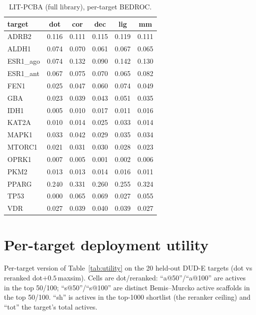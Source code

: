 \documentclass[10pt,letterpaper,twocolumn]{article}
\begin{document}
\begin{table}[h]
\centering
\scriptsize
\setlength{\tabcolsep}{3pt}
\caption{LIT-PCBA (full library), per-target BEDROC.}
\begin{tabular}{@{}lccccc@{}}
\toprule
target & dot & cor & dec & lig & mm \\
\midrule
ADRB2 & 0.116 & 0.111 & 0.115 & 0.119 & 0.111 \\
ALDH1 & 0.074 & 0.070 & 0.061 & 0.067 & 0.065 \\
ESR1\_ago & 0.074 & 0.132 & 0.090 & 0.142 & 0.130 \\
ESR1\_ant & 0.067 & 0.075 & 0.070 & 0.065 & 0.082 \\
FEN1 & 0.025 & 0.047 & 0.060 & 0.074 & 0.049 \\
GBA & 0.023 & 0.039 & 0.043 & 0.051 & 0.035 \\
IDH1 & 0.005 & 0.010 & 0.017 & 0.011 & 0.016 \\
KAT2A & 0.010 & 0.014 & 0.025 & 0.033 & 0.014 \\
MAPK1 & 0.033 & 0.042 & 0.029 & 0.035 & 0.034 \\
MTORC1 & 0.021 & 0.031 & 0.030 & 0.028 & 0.023 \\
OPRK1 & 0.007 & 0.005 & 0.001 & 0.002 & 0.006 \\
PKM2 & 0.013 & 0.013 & 0.014 & 0.016 & 0.011 \\
PPARG & 0.240 & 0.331 & 0.260 & 0.255 & 0.324 \\
TP53 & 0.000 & 0.065 & 0.069 & 0.027 & 0.055 \\
VDR & 0.027 & 0.039 & 0.040 & 0.039 & 0.027 \\
\bottomrule
\end{tabular}
\end{table}

\section{Per-target deployment utility}
\label{app:deploy}
Per-target version of Table~\ref{tab:utility} on the 20 held-out DUD-E targets (dot vs reranked dot$+0.5$\,maxsim). Cells are dot/reranked: ``a@50''/``a@100'' are actives in the top 50/100; ``s@50''/``s@100'' are distinct Bemis--Murcko active scaffolds in the top 50/100. ``sh'' is actives in the top-1000 shortlist (the reranker ceiling) and ``tot'' the target's total actives.
\end{document}
